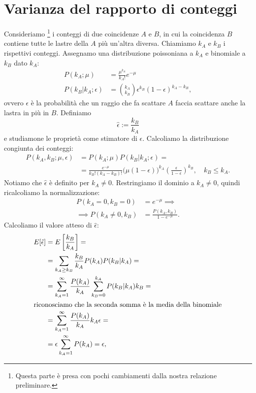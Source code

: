 \appendix
\section{Varianza del rapporto di conteggi}
\label{sec:vareff}

Consideriamo%
\footnote{Questa parte è presa con pochi cambiamenti dalla nostra relazione preliminare.}
i conteggi di due coincidenze $A$ e $B$,
in cui la coincidenza $B$ contiene tutte le lastre della $A$ più un'altra diversa.
Chiamiamo $k_A$ e $k_B$ i rispettivi conteggi.
Assegnamo una distribuzione poissoniana a $k_A$ e binomiale a $k_B$ dato $k_A$:
\begin{align*}
	P(k_A;\mu)
	&= \frac{\mu^{k_A}}{k_A!}e^{-\mu} \\
	P(k_B|k_A;\epsilon)
	&= \binom{k_A}{k_B} \epsilon^{k_B} (1-\epsilon)^{k_A-k_B},
\end{align*}
ovvero $\epsilon$ è la probabilità che un raggio che fa scattare $A$
faccia scattare anche la lastra in più in $B$.
Definiamo
\begin{equation*}
	\hat\epsilon := \frac{k_B}{k_A}
\end{equation*}
e studiamone le proprietà come stimatore di $\epsilon$.
Calcoliamo la distribuzione congiunta dei conteggi:
\begin{align*}
	P(k_A,k_B;\mu,\epsilon)
	&= P(k_A;\mu) P(k_B|k_A;\epsilon) = \\
	&= \frac{e^{-\mu}}{k_B!(k_A-k_B)!} \big(\mu(1-\epsilon)\big)^{k_A} \left(\frac\epsilon{1-\epsilon}\right)^{k_B},
	\quad k_B \le k_A.
\end{align*}
Notiamo che $\hat\epsilon$ è definito per $k_A\neq 0$.
Restringiamo il dominio a $k_A\neq 0$,
quindi ricalcoliamo la normalizzazione:
\begin{align*}
	P(k_A=0,k_B=0)
	&= e^{-\mu} \implies \\
	\implies P(k_A\neq 0,k_B)
	&= \frac{P(k_A,k_B)}{1-e^{-\mu}}.
\end{align*}
Calcoliamo il valore atteso di $\hat\epsilon$:
\begin{align*}
	E[\hat\epsilon]
	&= E \left[ \frac{k_B}{k_A} \right] = \\
	&= \sum_{k_A\ge k_B} \frac{k_B}{k_A} P(k_A) P(k_B|k_A) = \\
	&= \sum_{k_A=1}^\infty \frac{P(k_A)}{k_A}
	\sum_{k_B=0}^{k_A} P(k_B|k_A) k_B = \\
	\intertext{riconosciamo che la seconda somma è la media della binomiale}
	&= \sum_{k_A=1}^\infty \frac{P(k_A)}{k_A} k_A \epsilon = \\
	&= \epsilon \sum_{k_A=1}^\infty P(k_A)
	= \epsilon,
\end{align*}
